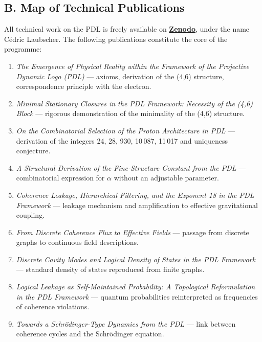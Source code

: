 \documentclass[12pt, a4paper, openright]{book}
\begin{document}
\subsection*{B. Map of Technical Publications}

All technical work on the PDL is freely available on \href{https://zenodo.org}{\textbf{Zenodo}}, under the name Cédric Laubscher. The following publications constitute the core of the programme:

\begin{enumerate}

\item \textit{The Emergence of Physical Reality within the Framework of the Projective Dynamic Logo (PDL)} — axioms, derivation of the (4,6) structure, correspondence principle with the electron.

\item \textit{Minimal Stationary Closures in the PDL Framework: Necessity of the (4,6) Block} — rigorous demonstration of the minimality of the (4,6) structure.

\item \textit{On the Combinatorial Selection of the Proton Architecture in PDL} — derivation of the integers 24, 28, 930, 10\,087, 11\,017 and uniqueness conjecture.

\item \textit{A Structural Derivation of the Fine-Structure Constant from the PDL} — combinatorial expression for $\alpha$ without an adjustable parameter.

\item \textit{Coherence Leakage, Hierarchical Filtering, and the Exponent 18 in the PDL Framework} — leakage mechanism and amplification to effective gravitational coupling.

\item \textit{From Discrete Coherence Flux to Effective Fields} — passage from discrete graphs to continuous field descriptions.

\item \textit{Discrete Cavity Modes and Logical Density of States in the PDL Framework} — standard density of states reproduced from finite graphs.

\item \textit{Logical Leakage as Self-Maintained Probability: A Topological Reformulation in the PDL Framework} — quantum probabilities reinterpreted as frequencies of coherence violations.

\item \textit{Towards a Schrödinger-Type Dynamics from the PDL} — link between coherence cycles and the Schrödinger equation.


\end{enumerate}
\end{document}

